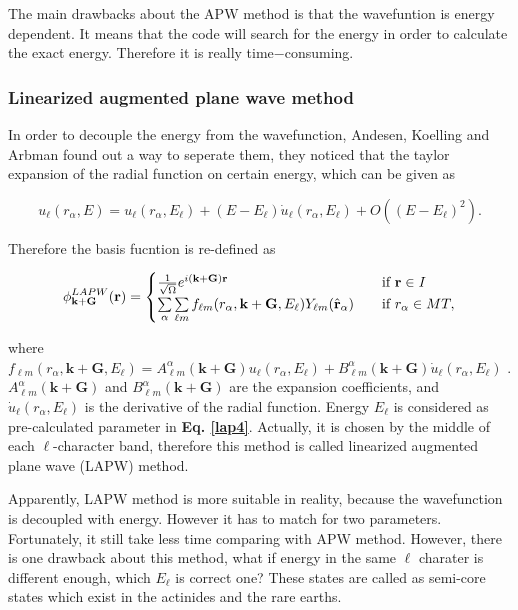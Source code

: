 \documentclass[a4paper, 12pt, titlepage,oneside,drop]{kthesis}
\begin{document}
The main drawbacks about the APW method is that the wavefuntion is energy dependent. It means that
 the code will search for the energy in order to calculate the exact energy. Therefore it 
is really time$-$consuming. 

\subsubsection{Linearized augmented plane wave method}
\noindent In order to decouple the energy from the wavefunction, Andesen, Koelling and Arbman found out a way to seperate them, they noticed that the taylor expansion of the radial function
on certain energy, which can be given as

\begin{equation}\label{ap3}
 u_{{\ell}}(r_{\alpha}, E) = u_{{\ell}}(r_{\alpha}, E_{\ell}) + (E-E_{\ell}) \dot{u}_{{\ell}}(r_{\alpha}, E_{\ell}) + O((E-E_{\ell})^2).
\end{equation}

Therefore the basis fucntion is re-defined as 

\begin{equation}\label{lap4}
\phi^{LAPW}_{\textbf{k}+\textbf{G}} (\textbf{r})= 
\begin{cases} \frac {1}{\sqrt{\Omega}} e^{i(\textbf{k}+\textbf{G})\textbf{r}} & \quad \mbox{if $\textbf{r} \in \textit{I} $}
\\
\sumg<\alpha>\sum\limits_{{\ell}m} f_{{\ell}{m}} (r_{\alpha},\textbf{k}+\textbf{G}, E_{\ell}) Y_{{\ell}m}(\hat{\textbf{r}}_{\alpha})  & \quad \mbox{if $r_{\alpha} \in MT, $}\\ 
\end{cases}
\end{equation}

where $f_{{\ell}{m}} (r_{\alpha},\textbf{k}+\textbf{G} ,E_{\ell}) =  A _{{\ell}m}^{\alpha} (\textbf {k}+\textbf{G}) u_{{\ell}}(r_{\alpha}, E_{\ell}) + B _{{\ell}m}^{\alpha} (\textbf {k}+\textbf{G}) \dot{u}_{{\ell}}(r_{\alpha}, E_{\ell})$
. $A _{{\ell}m}^{\alpha} (\textbf {k}+\textbf{G})$ and $B _{{\ell}m}^{\alpha} (\textbf {k}+\textbf{G})$ are the expansion coefficients, and $\dot{u}_{{\ell}}(r_{\alpha}, E_{\ell} )$ is the derivative of the radial function. Energy $E_{\ell}$  is considered as pre-calculated parameter in \textbf{Eq. \ref{lap4}}. Actually, it is chosen by the middle of  each $\ell$-character band, therefore this method is called linearized augmented plane wave (LAPW) method.

Apparently, LAPW method is more suitable in reality, because the wavefunction is decoupled with energy. However it has to match for two parameters.
Fortunately, it still take less time comparing with APW method. However, there is one drawback about this method, what if energy in the same $ {\ell} $ charater is different enough, 
which $E_{\ell}$ is correct one? These states are called as semi-core states which exist in the actinides and the rare earths.
\end{document}
